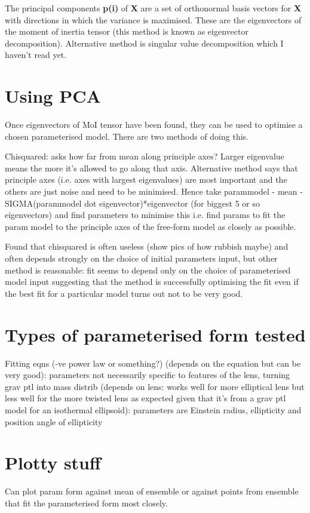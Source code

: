 \documentclass{article}
\begin{document}
The principal components \textbf{p(i)} of \textbf{X} are a set of orthonormal basis vectors for \textbf{X} with directions in which the variance is maximised. These are the eigenvectors of the moment of inertia tensor (this method is known as eigenvector decomposition). Alternative method is singular value decomposition which I haven't read yet.

\section{Using PCA}
Once eigenvectors of MoI tensor have been found, they can be used to optimise a chosen parameterised model. There are two methods of doing this.

Chisquared: asks how far from mean along principle axes? Larger eigenvalue means the more it's allowed to go along that axis. 
Alternative method says that principle axes (i.e. axes with largest eigenvalues) are most important and the others are just noise and need to be minimised. Hence take parammodel - mean - SIGMA(parammodel dot eigenvector)*eigenvector (for biggest 5 or so eigenvectors) and find parameters to minimise this i.e. find params to fit the param model to the principle axes of the free-form model as closely as possible.

Found that chisquared is often useless (show pics of how rubbish maybe) and often depends strongly on the choice of initial parameters input, but other method is reasonable: fit seems to depend only on the choice of parameterised model input suggesting that the method is successfully optimising the fit even if the best fit for a particular model turns out not to be very good.

\section{Types of parameterised form tested}
Fitting eqns (-ve power law or something?) (depends on the equation but can be very good): parameters not necessarily specific to features of the lens, 
turning grav ptl into mass distrib (depends on lens: works well for more elliptical lens but less well for the more twisted lens as expected given that it's from a grav ptl model for an isothermal ellipsoid): parameters are Einstein radius, ellipticity and position angle of ellipticity

\section{Plotty stuff}
Can plot param form against mean of ensemble or against points from ensemble that fit the parameterised form most closely.
\end{document}
